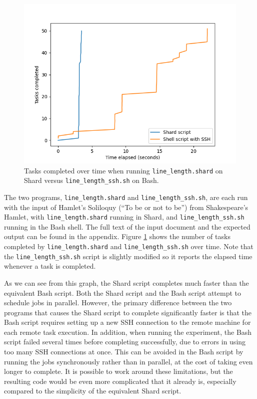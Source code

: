 \documentclass[oneside]{report}
\begin{document}
\begin{figure}[h]
  \begin{center}
    \includegraphics[scale=0.9]{img/experiments/e12_1621061398991.png}
    \caption{Tasks completed over time when running \texttt{line\_length.shard} on Shard versus \texttt{line\_length\_ssh.sh} on Bash.}
    \label{fig:linelength}
  \end{center}
\end{figure}

\begin{sloppypar}
  The two programs, \texttt{line\_length.shard} and \texttt{line\_length\_ssh.sh}, are each run with the input of Hamlet's Soliloquy (``To be or not to be'') from Shakespeare's Hamlet, with \texttt{line\_length.shard} running in Shard, and \texttt{line\_length\_ssh.sh} running in the Bash shell.
  The full text of the input document and the expected output can be found in the appendix.
  Figure \ref{fig:linelength} shows the number of tasks completed by \texttt{line\_length.shard} and \texttt{line\_length\_ssh.sh} over time.
  Note that the \texttt{line\_length\_ssh.sh} script is slightly modified so it reports the elapsed time whenever a task is completed.
\end{sloppypar}

As we can see from this graph, the Shard script completes much faster than the equivalent Bash script.
Both the Shard script and the Bash script attempt to schedule jobs in parallel.
However, the primary difference between the two programs that causes the Shard script to complete significantly faster is that the Bash script requires setting up a new SSH connection to the remote machine for each remote task execution.
In addition, when running the experiment, the Bash script failed several times before completing successfully, due to errors in using too many SSH connections at once.
This can be avoided in the Bash script by running the jobs synchronously rather than in parallel, at the cost of taking even longer to complete.
It is possible to work around these limitations, but the resulting code would be even more complicated that it already is, especially compared to the simplicity of the equivalent Shard script.
\end{document}
